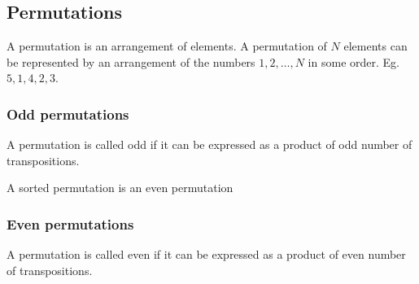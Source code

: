 \subsection{Permutations}

A permutation is an arrangement of elements. A permutation of $N$ elements can be represented by an arrangement of the numbers $1, 2, \dots, N$ in some order. Eg. $5, 1, 4, 2, 3$.

\subsubsection{Odd permutations}

A permutation is called odd if it can be expressed as a product of odd number of transpositions.

A sorted permutation is an even permutation

\subsubsection{Even permutations}

A permutation is called even if it can be expressed as a product of even number of transpositions.




